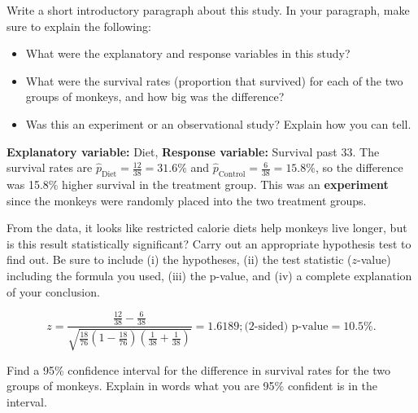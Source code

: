 \documentclass[12pt]{exam}
\begin{document}
\begin{questions}


\item Write a short introductory paragraph about this study. In your paragraph, make sure to explain the following:
\begin{itemize} 
\item What were the explanatory and response variables in this study?  
\item What were the survival rates (proportion that survived) for each of the two groups of monkeys, and how big was the difference? 
\item Was this an experiment or an observational study?  Explain how you can tell.
\end{itemize}

\begin{solution}
\textbf{Explanatory variable:} Diet, \textbf{Response variable:} Survival past 33. The survival rates are $\hat{p}_\text{Diet} = \tfrac{12}{38} = 31.6\%$ and $\hat{p}_\text{Control} = \tfrac{6}{38} = 15.8\%$, so the difference was 15.8\% higher survival in the treatment group.  This was an \textbf{experiment} since the monkeys were randomly placed into the two treatment groups. 
\end{solution}


\item From the data, it looks like restricted calorie diets help monkeys live longer, but is this result statistically significant? Carry out an appropriate hypothesis test to find out.  Be sure to include (i) the hypotheses, (ii) the test statistic ($z$-value) including the formula you used, (iii) the p-value, and (iv) a complete explanation of your conclusion.  

\begin{solution}
$$z = \frac{\frac{12}{38} - \frac{6}{38}}{\sqrt{\frac{18}{76}\left(1 - \tfrac{18}{76}\right)\left(\frac{1}{38} + \frac{1}{38}\right)}} = 1.6189; \text{(2-sided) p-value} = 10.5\%.$$ 
\end{solution}

\item Find a 95\% confidence interval for the difference in survival rates for the two groups of monkeys. Explain in words what you are 95\% confident is in the interval. 


\end{questions}
\end{document}
